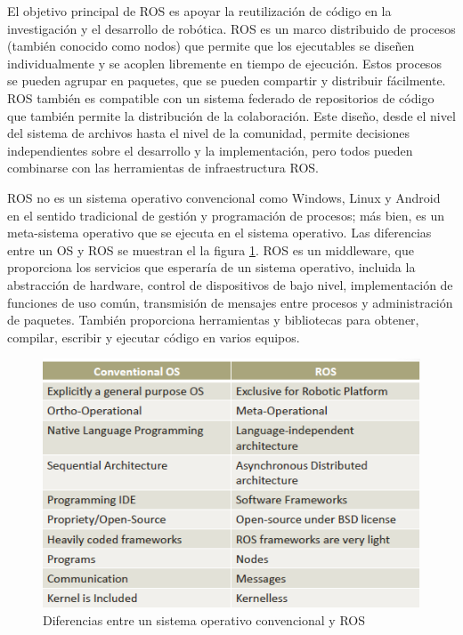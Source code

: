        El objetivo principal de ROS es apoyar la reutilización de código en la investigación y el desarrollo de robótica. ROS es un marco distribuido de procesos (también conocido como nodos) que permite que los ejecutables se diseñen individualmente y se acoplen libremente en tiempo de ejecución. Estos procesos se pueden agrupar en paquetes, que se pueden compartir y distribuir fácilmente. ROS también es compatible con un sistema federado de repositorios de código que también permite la distribución de la colaboración. Este diseño, desde el nivel del sistema de archivos hasta el nivel de la comunidad, permite decisiones independientes sobre el desarrollo y la implementación, pero todos pueden combinarse con las herramientas de infraestructura ROS.
       
       ROS no es un sistema operativo convencional como Windows, Linux y Android en el sentido tradicional de gestión y programación de procesos; más bien, es un meta-sistema operativo que se ejecuta en el sistema operativo. Las diferencias entre un OS y ROS se muestran el la figura \ref{f:Cap3-4_diferencias_ros_so}. ROS es un middleware, que proporciona los servicios que esperaría de un sistema operativo, incluida la abstracción de hardware, control de dispositivos de bajo nivel, implementación de funciones de uso común, transmisión de mensajes entre procesos y administración de paquetes. También proporciona herramientas y bibliotecas para obtener, compilar, escribir y ejecutar código en varios equipos.
       
        \begin{figure}[htb]
            \centering
            \includegraphics[width=0.65\linewidth]{Main/Chapter3/Images3/3-4/diferencia-ROS-SO.png}
            \caption{Diferencias entre un sistema operativo convencional y ROS}
            \label{f:Cap3-4_diferencias_ros_so}
        \end{figure}
        
        \newpage
        
